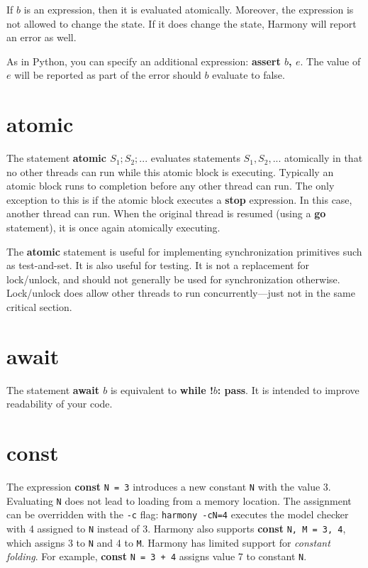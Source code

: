 \documentclass{report}
\begin{document}
If $b$ is an expression, then it is evaluated atomically.
Moreover, the expression is not allowed to change the state.
If it does change the state, Harmony will report an error as well.

As in Python, you can specify an additional expression:
\textbf{assert $b$, $e$}.  The value of $e$ will be reported as part
of the error should $b$ evaluate to false.

\section{\textbf{atomic}}

The statement \textbf{atomic $S_1; S_2; ...$} evaluates statements
$S_1, S_2, ...$ atomically in that no other threads can run while
this atomic block is executing.  Typically an atomic block runs
to completion before any other thread can run.  The only exception
to this is if the atomic block executes a \textbf{stop} expression.
In this case, another thread can run.  When the original thread
is resumed (using a \textbf{go} statement), it is once again
atomically executing.

The \textbf{atomic} statement is useful for implementing synchronization
primitives such as test-and-set.  It is also useful for testing.
It is not a replacement for lock/unlock, and should not generally be used
for synchronization otherwise.  Lock/unlock does allow other
threads to run concurrently---just not in the same critical section.

\section{\textbf{await}}

The statement \textbf{await $b$} is equivalent to \textbf{while !$b$: pass}.
It is intended to improve readability of your code.

\section{\textbf{const}}

The expression \textbf{const} \texttt{N = 3} introduces a new constant
\texttt{N} with the value 3.  Evaluating \texttt{N} does not lead to
loading from a memory location.  The assignment can be overridden with
the \texttt{-c} flag: \texttt{harmony -cN=4} executes the model checker
with 4 assigned to \texttt{N} instead of 3.
Harmony also supports \textbf{const} \texttt{N, M = 3, 4}, which
assigns 3 to \texttt{N} and 4 to \texttt{M}.
Harmony has limited support for \emph{constant folding}.  For example,
\textbf{const} \texttt{N = 3 + 4} assigns value 7 to constant \texttt{N}.
\end{document}
